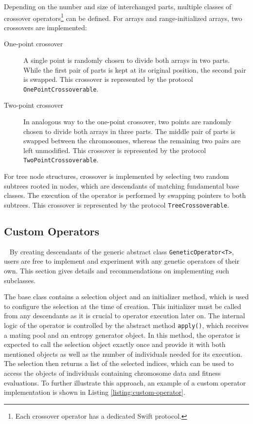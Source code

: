 Depending on the number and size of interchanged parts, multiple classes of crossover operators\footnote{Each crossover operator has a dedicated Swift protocol.} can be defined. For arrays and range-initialized arrays, two crossovers are implemented:
~
\begin{description}
	\item[One-point crossover]
	A single point is randomly chosen to divide both arrays in two parts. While the first pair of parts is kept at its original position, the second pair is swapped. This crossover is represented by the protocol \texttt{OnePointCrossoverable}.

	\item[Two-point crossover]
	In analogous way to the one-point crossover, two points are randomly chosen to divide both arrays in three parts. The middle pair of parts is swapped between the chromosomes, whereas the remaining two pairs are left unmodified. This crossover is represented by the protocol \texttt{TwoPointCrossoverable}.
\end{description}

For tree node structures, crossover is implemented by selecting two random subtrees rooted in nodes, which are descendants of matching fundamental base classes. The execution of the operator is performed by swapping pointers to both subtrees. This crossover is represented by the protocol \texttt{TreeCrossoverable}.


\subsection{Custom Operators}~\label{section:custom-operators}
By creating descendants of the generic abstract class \texttt{GeneticOperator<T>}, users are free to implement and experiment with any genetic operators of their own. This section gives details and recommendations on implementing such subclasses.

The base class contains a selection object and an initializer method, which is used to configure the selection at the time of creation. This initializer must be called from any descendants as it is crucial to operator execution later on. The internal logic of the operator is controlled by the abstract method \texttt{apply()}, which receives a mating pool and an entropy generator object. In this method, the operator is expected to call the selection object exactly once and provide it with both mentioned objects as well as the number of individuals needed for its execution. The selection then returns a list of the selected indices, which can be used to access the objects of individuals containing chromosome data and fitness evaluations. To further illustrate this approach, an example of a custom operator implementation is shown in Listing \ref{listing:custom-operator}.

